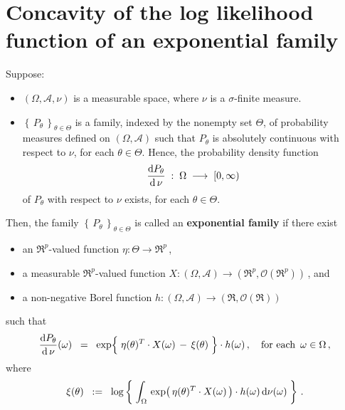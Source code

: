 

\section{Concavity of the log likelihood function of an exponential family}
\setcounter{theorem}{0}
\setcounter{equation}{0}

\renewcommand{\theenumi}{\roman{enumi}}
\renewcommand{\labelenumi}{\textnormal{(\theenumi)}$\;\;$}


\begin{definition}
\mbox{}\vskip 0.1cm
\noindent
Suppose:
\begin{itemize}
\item
	$(\Omega,\mathcal{A},\nu)$ is a measurable space, where $\nu$ is a $\sigma$-finite measure.
\item
	$\left\{\,P_{\theta}\,\right\}_{\theta \in \Theta}$ is a family, indexed by the nonempty set $\Theta$,
	of probability measures defined on $(\Omega,\mathcal{A})$ such that
	$P_{\theta}$ is absolutely continuous with respect to $\nu$, for each $\theta \in \Theta$.
	Hence, the probability density function
	\begin{equation*}
	\dfrac{\textnormal{d} P_{\theta}}{\textnormal{d}\,\nu} \; : \; \Omega \; \longrightarrow \; [0,\infty)
	\end{equation*}
	of $P_{\theta}$ with respect to $\nu$ exists, for each $\theta \in \Theta$.
\end{itemize}
Then, the family $\left\{\,P_{\theta}\,\right\}_{\theta \in \Theta}$ is called an \textbf{exponential family} if
there exist
\begin{itemize}
\item
	an $\Re^{p}$-valued function $\eta : \Theta \longrightarrow \Re^{p}$\,,
\item
	a measurable $\Re^{p}$-valued function $X : (\Omega,\mathcal{A}) \longrightarrow (\Re^{p},\mathcal{O}(\Re^{p}))$\,, and
\item
	a non-negative Borel function $h : (\Omega,\mathcal{A}) \longrightarrow (\Re,\mathcal{O}(\Re))$
\end{itemize}
such that
\begin{equation*}
\dfrac{\d P_{\theta}}{\d\,\nu}(\omega)
\;\; = \;\;
	\exp\!\left\{\; \eta(\theta)^{T} \cdot X(\omega) \,\overset{{\color{white}.}}{-}\, \xi(\theta) \;\right\}
	\cdot
 	h(\omega)\,,
	\quad
	\textnormal{for each \,$\omega\in\Omega$}\,,
\end{equation*}
where
\begin{equation*}
\xi(\theta)
\;\; := \;\;
	\log\left\{\;
		\int_{\Omega}\,
			\exp\!\left(\,\eta(\theta)^{T} \cdot X(\omega)\,\right) \cdot h(\omega)
		\,\textnormal{d}\nu(\omega)
	\;\right\}\,.
\end{equation*}
\end{definition}

